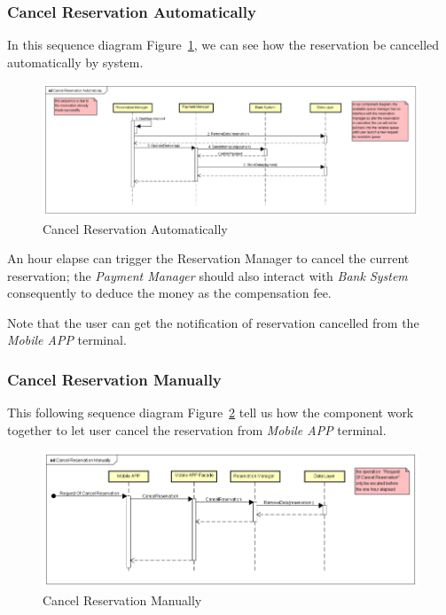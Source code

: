 \documentclass[a4paper,11pt]{article}
\begin{document}
		\subsubsection{Cancel Reservation Automatically}
In this sequence diagram Figure~\ref{fig-cancelaut}, we can see how the reservation be cancelled automatically by system.

		\begin{figure}[H]
   			\centering
   			\includegraphics[width=\textwidth]{images/cancel_reservation_automatically_SD}
  	    		\caption{Cancel Reservation Automatically}\label{fig-cancelaut}
		\end{figure}
		
An hour elapse can trigger the Reservation Manager to cancel the current reservation; the \textsl{Payment Manager} should also interact with \textsl{Bank System} consequently to deduce the money as the compensation fee.

Note that the user can get the notification of reservation cancelled from the \textsl{Mobile APP} terminal.

		\subsubsection{Cancel Reservation Manually}
This following sequence diagram Figure~\ref{fig-cancelman} tell us how the component work together to let user cancel the reservation from \textsl{Mobile APP} terminal.

		\begin{figure}[H]
   			\centering
   			\includegraphics[width=\textwidth]{images/cancel_reservation_manually_SD}
  	    		\caption{Cancel Reservation Manually}\label{fig-cancelman}
		\end{figure}
		
\end{document}
